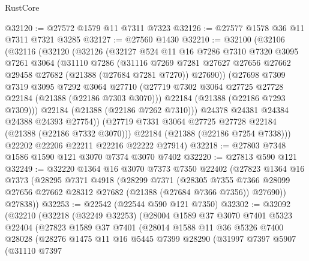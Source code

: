 \begin{lexlean}{RustCore}
\begin{coremodule}
@32120 := @27572 @1579 @11 @7311 @7323
@32126 := @27577 @1578 @36 @11 @7311 @7321 @3285
@32127 := @27560 @1430
@32210 := @32100
    (@32106
      (@32116
        (@32120
          (@32126
            (@32127
              @524
              @11
              @16
              @7286
              @7310
              @7320
              @3095
              @7261
              @3064
              (@31110
                @7286
                (@31116
                  @7269
                  @7281
                  @27627
                  @27656
                  @27662
                  @29458
                  @27682
                  (@21388 (@27684 @7281 @7270))
                  @27690))
              (@27698
                @7309
                @7319
                @3095
                @7292
                @3064
                @27710
                (@27719 @7302 @3064 @27725 @27728 @22184 (@21388 (@22186 @7303 @3070)))
                @22184
                (@21388 (@22186 @7293 @7309)))
              @22184
              (@21388 (@22186 @7262 @7310)))
            @24378
            @24381
            @24384
            @24388
            @24393
            @27754))
        (@27719 @7331 @3064 @27725 @27728 @22184 (@21388 (@22186 @7332 @3070)))
        @22184
        (@21388 (@22186 @7254 @7338)))
      @22202
      @22206
      @22211
      @22216
      @22222
      @27914)
@32218 := @27803 @7348 @1586 @1590 @121 @3070 @7374 @3070 @7402
@32220 := @27813 @590 @121
@32249 := @32220
    @1364
    @16
    @3070
    @7373
    @7350
    @22402
    (@27823
      @1364
      @16
      @7373
      (@28295
        @7371
        @4918
        (@28299
          @7371
          (@28305
            @7355
            @7366
            @28099
            @27656
            @27662
            @28312
            @27682
            (@21388 (@27684 @7366 @7356))
            @27690))
        @27838))
@32253 := @22542 (@22544 @590 @121 @7350)
@32302 := @32092
    (@32210
      (@32218
        (@32249 @32253)
        (@28004
          @1589
          @37
          @3070
          @7401
          @5323
          @22404
          (@27823
            @1589
            @37
            @7401
            (@28014
              @1588
              @11
              @36
              @5326
              @7400
              @28028
              (@28276
                @1475
                @11
                @16
                @5445
                @7399
                @28290
                (@31997
                  @7397
                  @5907
                  (@31110
                    @7397

\end{coremodule}
\end{lexlean}
